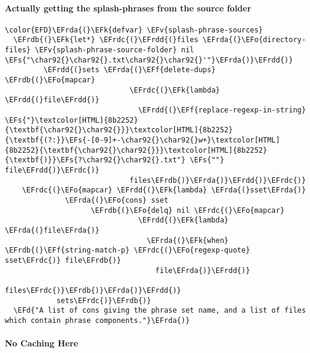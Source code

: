 \documentclass{article}
\newcommand{\EFs}[1]{\textcolor{EFs}{#1}} %
\newcommand{\EFd}[1]{\textcolor{EFd}{#1}} %
\newcommand{\EFk}[1]{\textcolor{EFk}{#1}} %
\newcommand{\EFf}[1]{\textcolor{EFf}{#1}} %
\newcommand{\EFv}[1]{\textcolor{EFv}{#1}} %
\newcommand{\EFo}[1]{\textcolor{EFo}{#1}} %
\newcommand{\EFrda}[1]{\textcolor{EFrda}{#1}} %
\newcommand{\EFrdb}[1]{\textcolor{EFrdb}{#1}} %
\newcommand{\EFrdc}[1]{\textcolor{EFrdc}{#1}} %
\newcommand{\EFrdd}[1]{\textcolor{EFrdd}{#1}} %
\begin{document}
\paragraph{Actually getting the splash-phrases from the source folder}
\label{sec:orgb7de89d}
\begin{Code}
\begin{Verbatim}
\color{EFD}\EFrda{(}\EFk{defvar} \EFv{splash-phrase-sources}
  \EFrdb{(}\EFk{let*} \EFrdc{(}\EFrdd{(}files \EFrda{(}\EFo{directory-files} \EFv{splash-phrase-source-folder} nil \EFs{"\char92{}\char92{}.txt\char92{}\char92{}'"}\EFrda{)}\EFrdd{)}
         \EFrdd{(}sets \EFrda{(}\EFf{delete-dups} \EFrdb{(}\EFo{mapcar}
                             \EFrdc{(}\EFk{lambda} \EFrdd{(}file\EFrdd{)}
                               \EFrdd{(}\EFf{replace-regexp-in-string} \EFs{"}\textcolor[HTML]{8b2252}{\textbf{\char92{}\char92{}}}\textcolor[HTML]{8b2252}{\textbf{(?:}}\EFs{-[0-9]+-\char92{}\char92{}w+}\textcolor[HTML]{8b2252}{\textbf{\char92{}\char92{}}}\textcolor[HTML]{8b2252}{\textbf{)}}\EFs{?\char92{}\char92{}.txt"} \EFs{""} file\EFrdd{)}\EFrdc{)}
                             files\EFrdb{)}\EFrda{)}\EFrdd{)}\EFrdc{)}
    \EFrdc{(}\EFo{mapcar} \EFrdd{(}\EFk{lambda} \EFrda{(}sset\EFrda{)}
              \EFrda{(}\EFo{cons} sset
                    \EFrdb{(}\EFo{delq} nil \EFrdc{(}\EFo{mapcar}
                               \EFrdd{(}\EFk{lambda} \EFrda{(}file\EFrda{)}
                                 \EFrda{(}\EFk{when} \EFrdb{(}\EFf{string-match-p} \EFrdc{(}\EFo{regexp-quote} sset\EFrdc{)} file\EFrdb{)}
                                   file\EFrda{)}\EFrdd{)}
                               files\EFrdc{)}\EFrdb{)}\EFrda{)}\EFrdd{)}
            sets\EFrdc{)}\EFrdb{)}
  \EFd{"A list of cons giving the phrase set name, and a list of files which contain phrase components."}\EFrda{)}

\end{Verbatim}
\end{Code}

\paragraph{No Caching Here}
\label{sec:org25d4d57}
\end{document}
